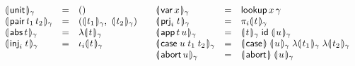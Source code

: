 \documentclass[a4paper,USenglish,cleveref, autoref]{lipics-v2019}
\begin{document}
\[
\begin{array}{lcl}
  \dent{\tunit}\gamma & = & \ttempty \\
  \dent{\tpair\,t_1\,t_2}\gamma & = &
    (\dent{t_1}\gamma,\ \dent{t_2}\gamma) \\
  \dent{\tabs\,t}\gamma & = & \fdent t \gamma \\
  \dent{\inj i t}\gamma & = & \iota_i \dent t \gamma \\
  \\
\end{array}
\quad
\begin{array}{lcl}
  \dent{\tvar\,x}\gamma & = & \tlookup\,x\,\gamma \\
  \dent{\prj i t}\gamma & = & \pi_i \dent t \gamma \\
  \dent{\tapp\,t\,u} \gamma & = &
     \dent t \gamma\;\tid\;\dent u \gamma \\
  \dent{\tcase\;u\;t_1\;t_2}\gamma & = &
     \dencase\;\dent u \gamma\;\fdent{t_1}\gamma\;\fdent{t_2}\gamma \\
  \dent{\tabort\,u}\gamma & = & \denabort\;\dent u \gamma \\
\end{array}
\]
\end{document}
